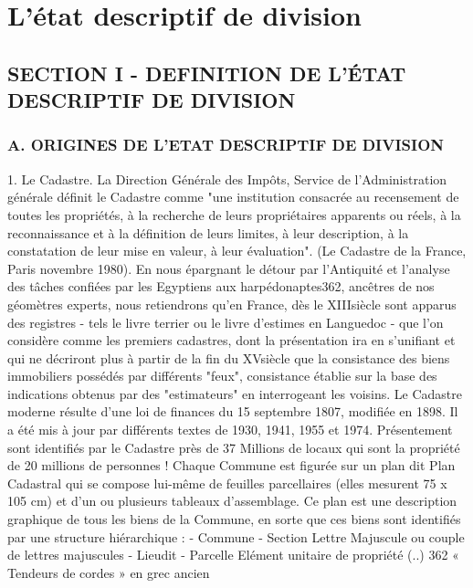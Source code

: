 \chapter{L'état descriptif de division}

\section{SECTION I - DEFINITION DE L'ÉTAT DESCRIPTIF DE DIVISION}

	\subsection{A. ORIGINES DE L'ETAT DESCRIPTIF DE DIVISION}
	
		1. Le Cadastre.
		La Direction Générale des Impôts, Service de l'Administration générale définit le Cadastre comme "une institution consacrée au recensement de toutes les propriétés, à la recherche de leurs propriétaires apparents ou réels, à la reconnaissance et à la définition de leurs limites, à leur description, à la constatation de leur mise en valeur, à leur évaluation". (Le Cadastre de la France, Paris novembre 1980).
		En nous épargnant le détour par l'Antiquité et l'analyse des tâches confiées par les Egyptiens aux harpédonaptes362, ancêtres de nos géomètres experts, nous retiendrons qu'en France, dès le XIII\degres siècle sont apparus des registres - tels le livre terrier ou le livre d'estimes en Languedoc - que l'on considère comme les premiers cadastres, dont la présentation ira en s'unifiant et qui ne décriront plus à partir de la fin du XV\degres siècle que la consistance des biens immobiliers possédés par différents "feux", consistance établie sur la base des indications obtenus par des "estimateurs" en interrogeant les voisins.
		Le Cadastre moderne résulte d'une loi de finances du 15 septembre 1807, modifiée en 1898. Il a été mis à jour par différents textes de 1930, 1941, 1955 et 1974.
		Présentement sont identifiés par le Cadastre près de 37 Millions de locaux qui sont la propriété de 20 millions de personnes !
		Chaque Commune est figurée sur un plan dit Plan Cadastral qui se compose lui-même de feuilles parcellaires (elles mesurent 75 x 105 cm) et d'un ou plusieurs tableaux d'assemblage. Ce plan est une description graphique de tous les biens de la Commune, en sorte que ces biens sont identifiés par une structure hiérarchique :
		- Commune
		- Section Lettre Majuscule ou couple de lettres majuscules
		- Lieudit
		- Parcelle Elément unitaire de propriété (\no ..)
		362 « Tendeurs de cordes » en grec ancien
